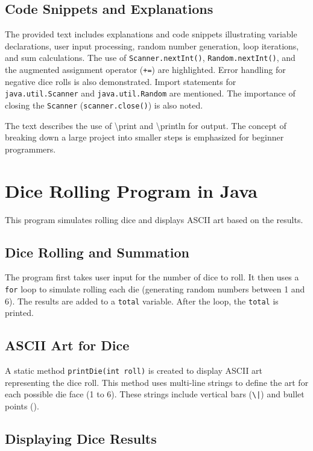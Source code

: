 \documentclass{article}
\begin{document}
\subsection{Code Snippets and Explanations}

The provided text includes explanations and code snippets illustrating variable declarations, user input processing, random number generation, loop iterations, and sum calculations.  The use of  \texttt{Scanner.nextInt()}, \texttt{Random.nextInt()}, and the augmented assignment operator (\texttt{+=}) are highlighted.  Error handling for negative dice rolls is also demonstrated.  Import statements for \texttt{java.util.Scanner} and \texttt{java.util.Random} are mentioned.  The importance of closing the \texttt{Scanner} (\texttt{scanner.close()}) is also noted.

The text describes the use of  \textbackslash{}print and \textbackslash{}println for output.  The concept of breaking down a large project into smaller steps is emphasized for beginner programmers.


\section{Dice Rolling Program in Java}

This program simulates rolling dice and displays ASCII art based on the results.

\subsection{Dice Rolling and Summation}

The program first takes user input for the number of dice to roll. It then uses a \texttt{for} loop to simulate rolling each die (generating random numbers between 1 and 6). The results are added to a \texttt{total} variable.  After the loop, the \texttt{total} is printed.

\subsection{ASCII Art for Dice}

A static method \texttt{printDie(int roll)} is created to display ASCII art representing the dice roll.  This method uses multi-line strings to define the art for each possible die face (1 to 6).  These strings include vertical bars (\texttt{\textbackslash|}) and bullet points (\texttt{\textbullet}).

\subsection{Displaying Dice Results}
\end{document}
